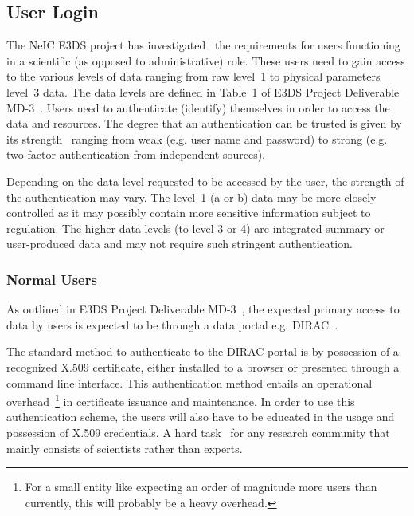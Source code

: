 \documentclass[12pt,a4paper]{article}
\begin{document}
\subsection{User Login}
\label{sec:users}

The NeIC E3DS project has investigated~\cite{e3ds-md3}
the requirements for users functioning in a scientific (as opposed to administrative) role.
These users need to gain access to the various levels of \ED data ranging from raw level~1 to physical parameters level~3 data.
The \ED data levels are defined in Table~1 of E3DS Project Deliverable MD-3~\cite{e3ds-md3}.
Users need to authenticate (identify) themselves in order to access the data and \einfra resources.
The degree that an authentication can be trusted is given by its strength~\cite{owasp-aai} ranging from weak (e.g. user name and password) to strong (e.g. two-factor authentication from independent sources).

Depending on the data level requested to be accessed by the \ED user, the strength of the authentication may vary.
The level~1 (a or b) data may be more closely controlled as it may %
possibly contain more sensitive information subject to regulation.
The higher data levels (to level 3 or 4) are integrated summary or user-produced data and may not require such stringent authentication.

\subsubsection{Normal Users}
\label{ssec:normal}

As outlined in E3DS Project Deliverable MD-3~\cite{e3ds-md3}, the expected primary access to \ED data by users is expected to be through a data portal e.g. DIRAC~\cite{dirac}.

The standard method to authenticate to the DIRAC portal is by possession of a recognized X.509 certificate, either installed to a browser or presented through a command line interface.
This authentication method entails an operational overhead~\footnote{For a small entity like \EC expecting an order of magnitude more users than currently, this will probably be a heavy overhead.} in certificate issuance and maintenance.
In order to use this authentication scheme, the \ED users will also have to be educated in the usage and possession of X.509 credentials.
A hard task~\cite{cert-example} for any research community that mainly consists of scientists rather than \einfra experts.
\end{document}
